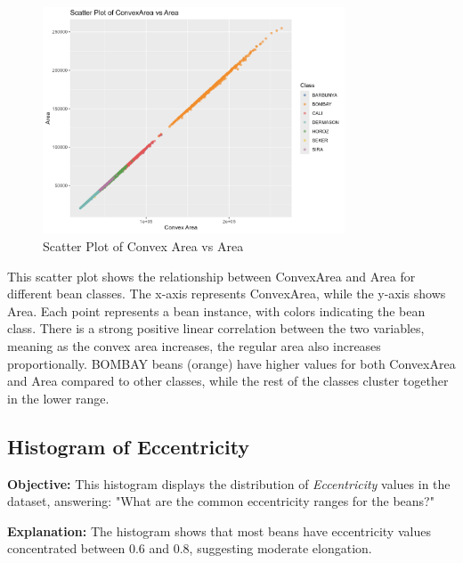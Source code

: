 \documentclass[a4paper,12pt]{article}
\begin{document}
\begin{figure}[H]
    \centering
    \includegraphics[width=0.8\textwidth]{graphs/scatter_convexarea_area.png}
    \caption{Scatter Plot of Convex Area vs Area}
    \label{fig:scatter_convex_area}
\end{figure}
This scatter plot shows the relationship between ConvexArea and Area for different bean classes. The x-axis represents ConvexArea, while the y-axis shows Area. Each point represents a bean instance, with colors indicating the bean class. There is a strong positive linear correlation between the two variables, meaning as the convex area increases, the regular area also increases proportionally. BOMBAY beans (orange) have higher values for both ConvexArea and Area compared to other classes, while the rest of the classes cluster together in the lower range.

\newpage

\subsection{Histogram of Eccentricity}
\noindent\textbf{Objective:} This histogram displays the distribution of \textit{Eccentricity} values in the dataset, answering: "What are the common eccentricity ranges for the beans?"

\noindent\textbf{Explanation:} The histogram shows that most beans have eccentricity values concentrated between 0.6 and 0.8, suggesting moderate elongation.
\end{document}
